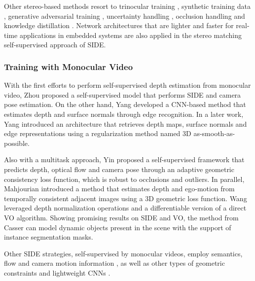 \documentclass[5p]{elsarticle}
\begin{document}
Other stereo-based methods resort to trinocular training \cite{poggi2018learning}, synthetic training data \cite{guo2018learning}, generative adversarial training \cite{cs2018monocular,aleotti2018generative,gupta2019unsupervised}, uncertainty handling \cite{chen2020self,poggi2020uncertainty}, occlusion handling \cite{gonzalezbello2020forget} and knowledge distillation \cite{pilzer2018unsupervised}. Network architectures that are lighter and faster for real-time applications in embedded systems \cite{poggi2018towards,peluso2019enabling,elkerdawy2019lightweight} are also applied in the stereo matching self-supervised approach of SIDE.

\subsubsection{Training with Monocular Video}

With the first efforts to perform self-supervised depth estimation from monocular video, Zhou \etal \cite{zhou2017unsupervised} proposed a self-supervised model that performs SIDE and camera pose estimation. On the other hand, Yang \etal \cite{yang2018unsupervised} developed a CNN-based method that estimates depth and surface normals through edge recognition. In a later work, Yang \etal \cite{yang2018lego} introduced an architecture that retrieves depth maps, surface normals and edge representations using a regularization method named 3D as-smooth-as-possible.

Also with a multitask approach, Yin \etal \cite{yin2018geonet} proposed a self-supervised framework that predicts depth, optical flow and camera pose through an adaptive geometric consistency loss function, which is robust to occlusions and outliers. In parallel, Mahjourian \etal \cite{mahjourian2018unsupervised} introduced a method that estimates depth and ego-motion from temporally consistent adjacent images using a 3D geometric loss function. Wang \etal \cite{wang2018learning} leveraged depth normalization operations and a differentiable version of a direct VO algorithm. Showing promising results on SIDE and VO, the method from Casser \etal \cite{casser2019depth} can model dynamic objects present in the scene with the support of instance segmentation masks. 

Other SIDE strategies, self-supervised by monocular videos, employ semantics, flow and camera motion information \cite{teed2018deepv2d,casser2019unsupervised,ranjan2019competitive,chen2019self,guizilini2020semantically}, as well as other types of geometric constraints \cite{chen2019self, guizilini2019packnet,sharma2019unsupervised} and lightweight CNNs \cite{liu2020mininet}.
\end{document}
